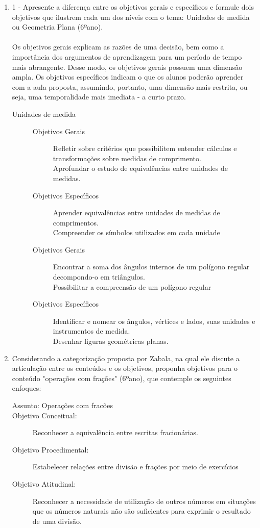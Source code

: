\documentclass[a4paper, 12pt]{article}
\begin{document}
\begin{enumerate}
\item 1 - Apresente a diferença entre os objetivos gerais e específicos e formule dois objetivos que ilustrem cada um dos níveis com o tema: Unidades de medida ou Geometria Plana (6ºano).\\\\
  Os objetivos gerais explicam as razões de uma decisão, bem como a importância dos argumentos de aprendizagem para um período de tempo mais abrangente. Desse modo, os objetivos gerais possuem uma dimensão ampla. Os objetivos específicos indicam o que os alunos poderão aprender com a aula proposta, assumindo, portanto, uma dimensão mais restrita, ou seja, uma temporalidade mais imediata - a curto prazo.
  \begin{description}
  \item[Unidades de medida]
    \begin{description}
    \item[Objetivos Gerais] Refletir sobre critérios que possibilitem entender cálculos e transformações sobre medidas de comprimento.\\
      Aprofundar o estudo de equivalências entre unidades de medidas.
    \item[Objetivos Específicos] Aprender equivalências entre unidades de medidas de comprimentos.\\
      Compreender os símbolos utilizados em cada unidade
    \end{description}
    \begin{description}
    \item[Objetivos Gerais] Encontrar a soma dos ângulos internos de um polígono regular decompondo-o em triângulos.\\
      Possibilitar a compreensão de um polígono regular
    \item[Objetivos Específicos] Identificar e nomear os ângulos, vértices e lados, suas unidades e instrumentos de medida.\\
      Desenhar figuras geométricas planas.      
    \end{description}
  \end{description}
  
\item Considerando a categorização proposta por Zabala, na qual ele discute a articulação entre os conteúdos e os objetivos, proponha objetivos para o conteúdo "operações com frações" (6ºano), que contemple os seguintes enfoques:
\begin{description}
\item[Assunto: Operações com fracões]
\item[Objetivo Conceitual:] Reconhecer a equivalência entre escritas fracionárias.
\item[Objetivo Procedimental:] Estabelecer relações entre divisão e frações por meio de exercícios
\item[Objetivo Atitudinal:] Reconhecer a necessidade de utilização de outros números em situações que os números naturais não são suficientes para exprimir o resultado de uma divisão.  
\end{description}
\end{enumerate}  
\end{document}
